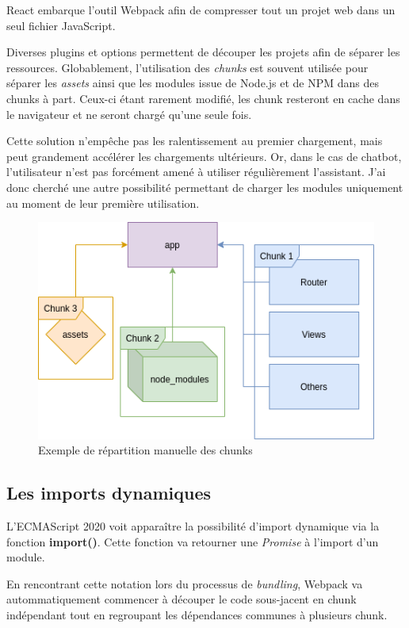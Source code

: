 \documentclass[12pt,a4paper,oneside]{scrreprt}
\begin{document}
React embarque l'outil Webpack afin de compresser tout un projet web dans un seul fichier JavaScript.

Diverses plugins et options permettent de découper les projets afin de séparer les ressources. Globablement, l'utilisation des \textit{chunks} est souvent utilisée pour séparer les \textit{assets} ainsi que les modules issue de Node.js et de NPM dans des chunks à part. Ceux-ci étant rarement modifié, les chunk resteront en cache dans le navigateur et ne seront chargé qu'une seule fois.

Cette solution n'empêche pas les ralentissement au premier chargement, mais peut grandement accélérer les chargements ultérieurs. Or, dans le cas de chatbot, l'utilisateur n'est pas forcément amené à utiliser régulièrement l'assistant. J'ai donc cherché une autre possibilité permettant de charger les modules uniquement au moment de leur première utilisation.

\begin{figure}[!ht]
	\centering
	\includegraphics[width=\textwidth]{pictures/webpack_chunks.png}
	\caption{Exemple de répartition manuelle des chunks}
\end{figure}

\newpage
\subsection{Les imports dynamiques}

L'ECMAScript 2020 voit apparaître la possibilité d'import dynamique via la fonction \textbf{import()}. Cette fonction va retourner une \textit{Promise} à l'import d'un module.

En rencontrant cette notation lors du processus de \og\textit{bundling}\fg{}, Webpack va autommatiquement commencer à découper le code sous-jacent en chunk indépendant tout en regroupant les dépendances communes à plusieurs chunk.
\end{document}
